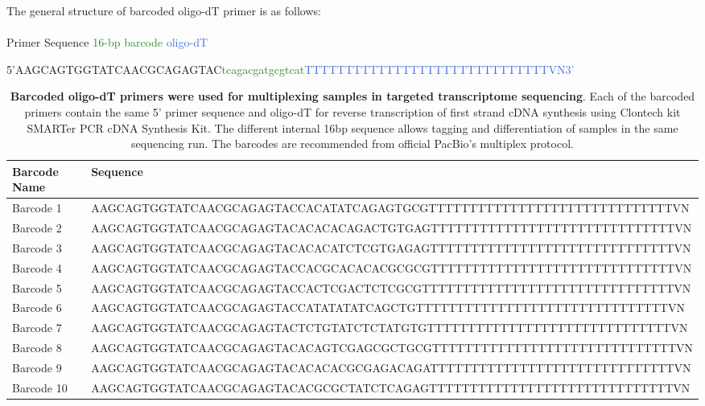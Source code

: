\begin{landscape}
	The general structure of barcoded oligo-dT primer is as follows:
	\\
	\\
	\hangindent=5cm \textcolor{RedOrange}{Primer Sequence} \hspace{2cm}   \textcolor{ForestGreen}{16-bp barcode}   \hspace{4cm} \textcolor{RoyalBlue}{oligo-dT}
	\begin{center}
		5'\textcolor{RedOrange}{AAGCAGTGGTATCAACGCAGAGTAC}\textcolor{ForestGreen}{tcagacgatgcgtcat}\textcolor{RoyalBlue}{TTTTTTTTTTTTTTTTTTTTTTTTTTTTTTVN3’}
	\end{center}
	\vspace{1cm}

	\begin{table}[ht]
		\captionsetup{justification=raggedright,width=1.45\textwidth}
		\caption[Barcoded Oligo-dT Primers for targeted transcriptome sequencing]%
		{\textbf{Barcoded oligo-dT primers were used for multiplexing samples in targeted transcriptome sequencing}. Each of the barcoded primers contain the same 5' primer sequence and oligo-dT for reverse transcription of first strand cDNA synthesis using Clontech kit SMARTer PCR cDNA Synthesis Kit. The different internal 16bp sequence allows tagging and differentiation of samples in the same sequencing run. The barcodes are recommended from official PacBio's multiplex protocol.}
		\label{tab:barcode_primers}
		\begin{tabularx}{1.45\textwidth}{ll}
			\toprule
			Barcode Name & Sequence                                                                  \\ \midrule
			Barcode 1    & AAGCAGTGGTATCAACGCAGAGTACCACATATCAGAGTGCGTTTTTTTTTTTTTTTTTTTTTTTTTTTTTTVN \\
			Barcode 2    & AAGCAGTGGTATCAACGCAGAGTACACACACAGACTGTGAGTTTTTTTTTTTTTTTTTTTTTTTTTTTTTTVN \\
			Barcode 3    & AAGCAGTGGTATCAACGCAGAGTACACACATCTCGTGAGAGTTTTTTTTTTTTTTTTTTTTTTTTTTTTTTVN \\
			Barcode 4    & AAGCAGTGGTATCAACGCAGAGTACCACGCACACACGCGCGTTTTTTTTTTTTTTTTTTTTTTTTTTTTTTVN \\
			Barcode 5    & AAGCAGTGGTATCAACGCAGAGTACCACTCGACTCTCGCGTTTTTTTTTTTTTTTTTTTTTTTTTTTTTTTVN \\
			Barcode 6    & AAGCAGTGGTATCAACGCAGAGTACCATATATATCAGCTGTTTTTTTTTTTTTTTTTTTTTTTTTTTTTTTVN \\
			Barcode 7    & AAGCAGTGGTATCAACGCAGAGTACTCTGTATCTCTATGTGTTTTTTTTTTTTTTTTTTTTTTTTTTTTTTVN \\
			Barcode 8    & AAGCAGTGGTATCAACGCAGAGTACACAGTCGAGCGCTGCGTTTTTTTTTTTTTTTTTTTTTTTTTTTTTTVN \\
			Barcode 9    & AAGCAGTGGTATCAACGCAGAGTACACACACGCGAGACAGATTTTTTTTTTTTTTTTTTTTTTTTTTTTTTVN \\
			Barcode 10 & AAGCAGTGGTATCAACGCAGAGTACACGCGCTATCTCAGAGTTTTTTTTTTTTTTTTTTTTTTTTTTTTTTVN \\ \bottomrule
		\end{tabularx}
	\end{table}
\end{landscape}


